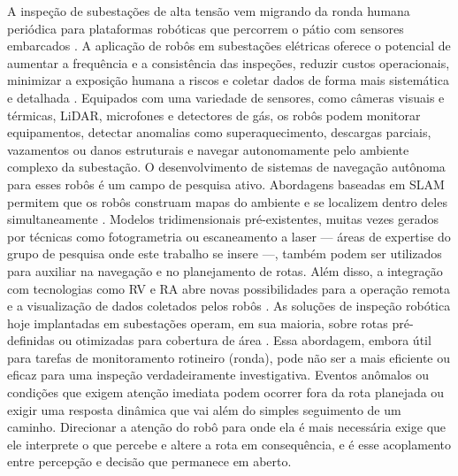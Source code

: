 A inspeção de subestações de alta tensão vem migrando da ronda humana periódica para plataformas robóticas que percorrem o pátio com sensores embarcados \cite{Wei2024Advancements}. A aplicação de robôs em subestações elétricas oferece o potencial de aumentar a frequência e a consistência das inspeções, reduzir custos operacionais, minimizar a exposição humana a riscos e coletar dados de forma mais sistemática e detalhada \cite{RobotnikSubstationBenefits}. Equipados com uma variedade de sensores, como câmeras visuais e térmicas, \ac{LiDAR}, microfones e detectores de gás, os robôs podem monitorar equipamentos, detectar anomalias como superaquecimento, descargas parciais, vazamentos ou danos estruturais e navegar autonomamente pelo ambiente complexo da subestação.
O desenvolvimento de sistemas de navegação autônoma para esses robôs é um campo de pesquisa ativo. Abordagens baseadas em \ac{SLAM} permitem que os robôs construam mapas do ambiente e se localizem dentro deles simultaneamente \cite{Kim2018SLAMMapping}. Modelos tridimensionais pré-existentes, muitas vezes gerados por técnicas como fotogrametria ou escaneamento a laser --- áreas de expertise do grupo de pesquisa onde este trabalho se insere ---, também podem ser utilizados para auxiliar na navegação e no planejamento de rotas. Além disso, a integração com tecnologias como \ac{RV} e \ac{RA} abre novas possibilidades para a operação remota e a visualização de dados coletados pelos robôs \cite{Ding2022QuadrupedDigitalTwin}.
As soluções de inspeção robótica hoje implantadas em subestações operam, em sua maioria, sobre rotas pré-definidas ou otimizadas para cobertura de área \cite{TJH2b2023Trends}. Essa abordagem, embora útil para tarefas de monitoramento rotineiro (ronda), pode não ser a mais eficiente ou eficaz para uma inspeção verdadeiramente investigativa. Eventos anômalos ou condições que exigem atenção imediata podem ocorrer fora da rota planejada ou exigir uma resposta dinâmica que vai além do simples seguimento de um caminho. Direcionar a atenção do robô para onde ela é mais necessária exige que ele interprete o que percebe e altere a rota em consequência, e é esse acoplamento entre percepção e decisão que permanece em aberto.

